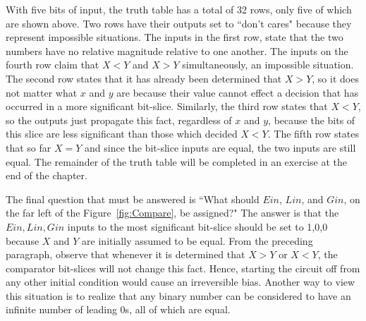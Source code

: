 With five bits of input, the truth table has a total of 32 rows, only
five of which are shown above.  Two rows have their outputs set to 
``don't cares" because they represent impossible situations.  The inputs
in the first row, state that the two numbers have no relative 
magnitude relative to one another.  The inputs on the fourth row 
claim that $X<Y$ and $X>Y$ simultaneously, an impossible situation.
The second row states that it has already been determined that $X>Y$,
so it does not matter what $x$ and $y$ are because their value cannot 
effect a decision that has occurred
in a more significant bit-slice.  Similarly, the third row states
that $X<Y$, so the outputs just propagate this fact, regardless 
of $x$ and $y$, because the bits of this slice are less significant
than those which decided $X<Y$.  The fifth row states that
so far $X=Y$ and since the bit-slice inputs are equal, the 
two inputs are still equal.  The remainder of the truth table will
be completed in an exercise at the end of the chapter.

The final question that must be answered is ``What should $Ein$, $Lin$,
and $Gin$, on the far left of the Figure~\ref{fig:Compare}, be assigned?"
The answer is that the $Ein, Lin,Gin$ inputs to the most significant bit-slice
should be set to 1,0,0 because $X$ and $Y$ are initially assumed to be equal.
From the preceding paragraph, observe that whenever it is determined
that $X>Y$ or $X<Y$, the comparator bit-slices will not change this 
fact.  Hence, starting the circuit off from any other initial condition
would cause an irreversible bias.  Another way to view this situation
is to realize that any binary number can be considered to have an infinite 
number of leading 0s, all of which are equal.

